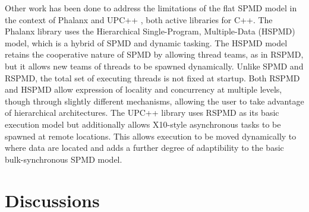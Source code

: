 Other work has been done to address the limitations of the flat SPMD
model in the context of Phalanx \cite{phalanx} and UPC++
\cite{upcxx_ipdps14}, both active libraries for C++. The Phalanx
library uses the Hierarchical Single-Program, Multiple-Data (HSPMD)
model, which is a hybrid of SPMD and dynamic tasking. The HSPMD model
retains the cooperative nature of SPMD by allowing thread teams, as in
RSPMD, but it allows new teams of threads to be spawned dynamically.
Unlike SPMD and RSPMD, the total set of executing threads is not fixed
at startup. Both RSPMD and HSPMD allow expression of locality and
concurrency at multiple levels, though through slightly different
mechanisms, allowing the user to take advantage of hierarchical
architectures. The UPC++ library uses RSPMD as its basic execution
model but additionally allows X10-style asynchronous tasks to be
spawned at remote locations. This allows execution to be moved
dynamically to where data are located and adds a further degree of
adaptibility to the basic bulk-synchronous SPMD model.

\section{Discussions}

